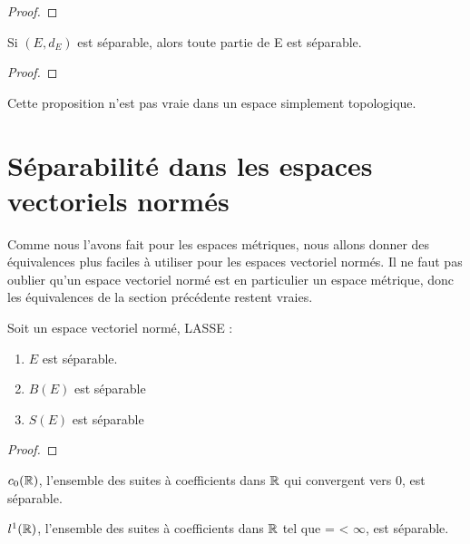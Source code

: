 \begin{proof}
	
\end{proof}

\begin{proposition}
	Si $(E, d_{E})$ est séparable, alors toute partie de E est séparable.
\end{proposition}

\begin{proof}
	
\end{proof}

\begin{remarque}
	Cette proposition n'est pas vraie dans un espace simplement topologique.
\end{remarque}

\section{Séparabilité dans les espaces vectoriels normés}

Comme nous l'avons fait pour les espaces métriques, nous allons donner des
équivalences plus faciles à utiliser pour les espaces vectoriel normés. Il ne
faut pas oublier qu'un espace vectoriel normé est en particulier un espace
métrique, donc les équivalences de la section précédente restent vraies.

\begin{proposition}
	Soit  un espace vectoriel normé, LASSE :
	\begin{enumerate}
		\item $E$ est séparable.
		\item $B(E)$ est séparable
		\item $S(E)$ est séparable
	\end{enumerate}
\end{proposition}

\begin{proof}
	
\end{proof}

\begin{exemple}
	$c_{0}(\mathbb{R})$, l'ensemble des suites à coefficients dans $\mathbb{R}$
	qui convergent vers 0, est séparable.
\end{exemple}

\begin{exemple}
	$l^{1}(\mathbb{R})$, l'ensemble des suites à coefficients dans $\mathbb{R}$
	tel que  =  < $\infty$, est
	séparable.
\end{exemple}

